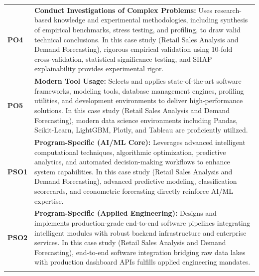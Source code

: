 {\begin{longtable}{@{}>{\centering\arraybackslash}p{1.8cm} p{13.2cm}@{}}
    \addlinespace
\textbf{PO4} & \textbf{Conduct Investigations of Complex Problems:} Uses research-based knowledge and experimental methodologies, including synthesis of empirical benchmarks, stress testing, and profiling, to draw valid technical conclusions. In this case study (Retail Sales Analysis and Demand Forecasting), rigorous empirical validation using 10-fold cross-validation, statistical significance testing, and SHAP explainability provides experimental rigor. \\
    \addlinespace
\textbf{PO5} & \textbf{Modern Tool Usage:} Selects and applies state-of-the-art software frameworks, modeling tools, database management engines, profiling utilities, and development environments to deliver high-performance solutions. In this case study (Retail Sales Analysis and Demand Forecasting), modern data science environments including Pandas, Scikit-Learn, LightGBM, Plotly, and Tableau are proficiently utilized. \\
    \addlinespace
\textbf{PSO1} & \textbf{Program-Specific (AI/ML Core):} Leverages advanced intelligent computational techniques, algorithmic optimization, predictive analytics, and automated decision-making workflows to enhance system capabilities. In this case study (Retail Sales Analysis and Demand Forecasting), advanced predictive modeling, classification scorecards, and econometric forecasting directly reinforce AI/ML expertise. \\
    \addlinespace
\textbf{PSO2} & \textbf{Program-Specific (Applied Engineering):} Designs and implements production-grade end-to-end software pipelines integrating intelligent modules with robust backend infrastructure and enterprise services. In this case study (Retail Sales Analysis and Demand Forecasting), end-to-end software integration bridging raw data lakes with production dashboard APIs fulfills applied engineering mandates. \\
    \addlinespace
    \bottomrule
\end{longtable}}